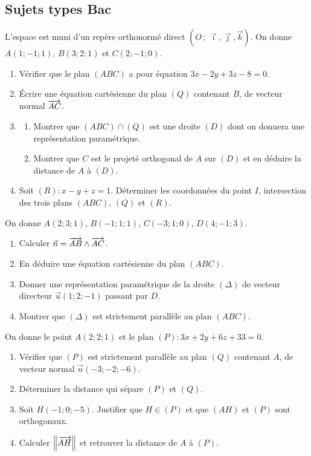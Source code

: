\subsection{Sujets types Bac}

L'espace est muni d'un repère orthonormé direct
$(O\,;\,\vec\imath,\vec\jmath,\vec k)$. On donne
$A(1;-1;1)$, $B(3;2;1)$ et $C(2;-1;0)$.
\begin{enumerate}
	\item Vérifier que le plan $(ABC)$ a pour équation $3x - 2y + 3z - 8 = 0$.
	\item Écrire une équation cartésienne du plan $(Q)$ contenant $B$, de
	vecteur normal $\overrightarrow{AC}$.
	\item
	\begin{enumerate}
		\item Montrer que $(ABC) \cap (Q)$ est une droite $(D)$ dont on donnera
		une représentation paramétrique.
		\item Montrer que $C$ est le projeté orthogonal de $A$ sur $(D)$ et en
		déduire la distance de $A$ à $(D)$.
	\end{enumerate}
	\item Soit $(R) : x - y + z = 1$. Déterminer les coordonnées du point $I$,
	intersection des trois plans $(ABC)$, $(Q)$ et $(R)$.
\end{enumerate}

On donne $A(2;3;1)$, $B(-1;1;1)$, $C(-3;1;0)$, $D(4;-1;3)$.
\begin{enumerate}
	\item Calculer $\vec n = \overrightarrow{AB} \wedge \overrightarrow{AC}$.
	\item En déduire une équation cartésienne du plan $(ABC)$.
	\item Donner une représentation paramétrique de la droite $(\Delta)$ de
	vecteur directeur $\vec u(1;2;-1)$ passant par $D$.
	\item Montrer que $(\Delta)$ est strictement parallèle au plan $(ABC)$.
\end{enumerate}

On donne le point $A(2;2;1)$ et le plan $(P) : 3x + 2y + 6z + 33 = 0$.
\begin{enumerate}
	\item Vérifier que $(P)$ est strictement parallèle au plan $(Q)$ contenant
	$A$, de vecteur normal $\vec n(-3;-2;-6)$.
	\item Déterminer la distance qui sépare $(P)$ et $(Q)$.
	\item Soit $H(-1;0;-5)$. Justifier que $H \in (P)$ et que $(AH)$ et $(P)$
	sont orthogonaux.
	\item Calculer $\left\|\overrightarrow{AH}\right\|$ et retrouver la distance de $A$ à
	$(P)$.
\end{enumerate}

